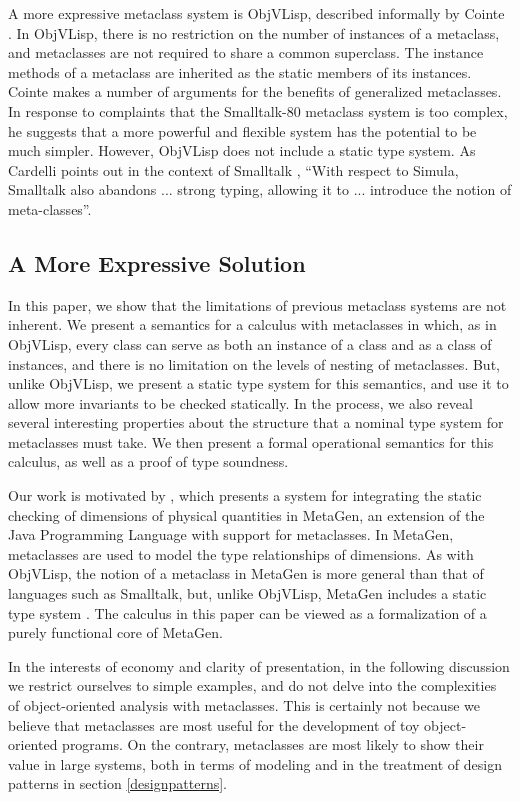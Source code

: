 \documentclass[10pt]{acm-sigplan}
\begin{document}
A more expressive metaclass system is ObjVLisp, described informally
by Cointe \cite{objvlisp}.  In ObjVLisp, there is no restriction on
the number of instances of a metaclass, and metaclasses are not
required to share a common superclass. The instance methods of a
metaclass are inherited as the static members of its instances.  Cointe
makes a number of arguments for the benefits of generalized
metaclasses.  In response to complaints that the Smalltalk-80 metaclass
system is too complex, he suggests that a more powerful and flexible
system has the potential to be much simpler.
However, ObjVLisp does not include a static type system.  As Cardelli
points out in the context of Smalltalk \cite{cardelli:multiple}, ``With
respect to Simula, Smalltalk also abandons ... strong typing, allowing
it to ... introduce the notion of meta-classes''.


\subsection{A More Expressive Solution}

In this paper, we show that the limitations of previous metaclass
systems are not inherent. We present a semantics for a calculus with
metaclasses in which, as in ObjVLisp, every class can serve as both an
instance of a class and as a class of instances, and there is no
limitation on the levels of nesting of metaclasses. But, unlike
ObjVLisp, we present a static type system for this semantics, and use
it to allow more invariants to be checked statically.  In the process,
we also reveal several interesting properties about the structure that
a nominal type system for metaclasses must take. We then present a
formal operational semantics for this calculus, as well as a proof of
type soundness.

Our work is motivated by \cite{DimUnits}, which presents a system for
integrating the static checking of dimensions of physical quantities
in MetaGen, an extension of the Java Programming Language with support
for metaclasses. In MetaGen, metaclasses are used to model the type
relationships of dimensions.  As with ObjVLisp, the notion of a
metaclass in MetaGen is more general than that of languages such as
Smalltalk, but, unlike ObjVLisp, MetaGen includes a static type system
\cite{DimUnits}. The calculus in this paper can be viewed as a
formalization of a purely functional core of MetaGen.

In the interests of economy and clarity of presentation, in the
following discussion we restrict ourselves to simple examples, and do
not delve into the complexities of object-oriented analysis with
metaclasses.  This is certainly not because we believe that
metaclasses are most useful for the development of toy object-oriented
programs.  On the contrary, metaclasses are most likely to show their
value in large systems, both in terms of modeling and in the treatment
of design patterns in section \ref{designpatterns}.
\end{document}
